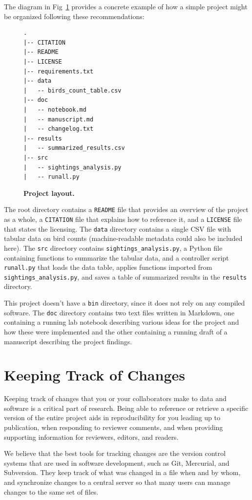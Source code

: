 \documentclass[10pt,letterpaper]{article}
\newcommand{\practicesection}[2]{\section{#1}\label{#2}}
\begin{document}
The diagram in Fig~\ref{fig:project} provides a concrete example of
how a simple project might be organized following these
recommendations:

\begin{figure}
{\small
\begin{verbatim}
.
|-- CITATION
|-- README
|-- LICENSE
|-- requirements.txt
|-- data
|   -- birds_count_table.csv
|-- doc
|   -- notebook.md
|   -- manuscript.md
|   -- changelog.txt
|-- results
|   -- summarized_results.csv
|-- src
|   -- sightings_analysis.py
|   -- runall.py
\end{verbatim}
}
\caption{\textbf{Project layout.}}
\label{fig:project}
\end{figure}

The root directory contains a \texttt{README} file that provides an
overview of the project as a whole, a \texttt{CITATION} file that
explains how to reference it, and a \texttt{LICENSE} file that states the
licensing. The \texttt{data} directory contains a
single CSV file with tabular data on bird counts (machine-readable
metadata could also be included here). The \texttt{src} directory
contains \texttt{sightings\_analysis.py}, a Python file containing
functions to summarize the tabular data, and a controller script
\texttt{runall.py} that loads the data table, applies functions
imported from \texttt{sightings\_analysis.py}, and saves a table of
summarized results in the \texttt{results} directory.

This project doesn't have a \texttt{bin} directory, since it does not
rely on any compiled software. The \texttt{doc} directory contains two
text files written in Markdown, one containing a running lab notebook
describing various ideas for the project and how these were
implemented and the other containing a running draft of a manuscript
describing the project findings.

\practicesection{Keeping Track of Changes}{sec:versioning}

Keeping track of changes that you or your collaborators make to data
and software is a critical part of research. Being able to reference or
retrieve a specific version of the entire project aids in reproducibility
for you leading up to publication, when responding to reviewer comments,
and when providing supporting information for reviewers, editors,
and readers.

We believe that the best tools for tracking changes are the version
control systems that are used in software development, such as Git,
Mercurial, and Subversion. They keep track of what was changed in a
file when and by whom, and synchronize changes to a central server so
that many users can manage changes to the same set of files.
\end{document}
